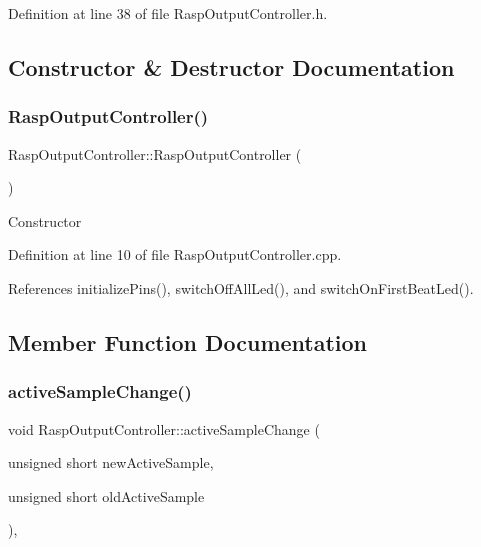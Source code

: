Definition at line 38 of file Rasp\+Output\+Controller.\+h.



\subsection{Constructor \& Destructor Documentation}
\mbox{\label{class_rasp_output_controller_afd7487de7ff81c6b092f4072d4fa80a5}} 
\subsubsection{\texorpdfstring{Rasp\+Output\+Controller()}{RaspOutputController()}}
{\footnotesize\ttfamily Rasp\+Output\+Controller\+::\+Rasp\+Output\+Controller (\begin{DoxyParamCaption}{ }\end{DoxyParamCaption})}

Constructor 

Definition at line 10 of file Rasp\+Output\+Controller.\+cpp.



References initialize\+Pins(), switch\+Off\+All\+Led(), and switch\+On\+First\+Beat\+Led().



\subsection{Member Function Documentation}
\mbox{\label{class_rasp_output_controller_a92954cf26d4dd5f7d8835d1d508302c0}} 
\subsubsection{\texorpdfstring{active\+Sample\+Change()}{activeSampleChange()}}
{\footnotesize\ttfamily void Rasp\+Output\+Controller\+::active\+Sample\+Change (\begin{DoxyParamCaption}\item[{unsigned short}]{new\+Active\+Sample,  }\item[{unsigned short}]{old\+Active\+Sample }\end{DoxyParamCaption})\hspace{0.3cm}{\ttfamily [override]}, {\ttfamily [virtual]}}

